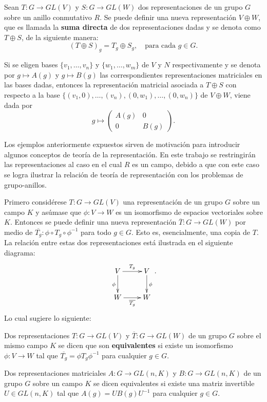 \begin{ejemplo}
Sean $T \colon G \to GL(V)$ y $S \colon G \to GL(W)$ dos representaciones de un grupo $G$ sobre un anillo conmutativo $R$. Se puede definir una nueva representación $V \oplus W$, que es llamada la \textbf{suma directa} de dos representaciones dadas y se denota como $T \oplus S$, de la siguiente manera: \begin{equation*} (T \oplus S)_g = T_g \oplus S_g, \quad \mbox{para cada } g \in G. \end{equation*}

Si se eligen bases $\{v_1, \dots, v_n\}$ y $\{ w_1, \dots, w_m \}$ de $V$ y $N$ respectivamente y se denota por $g \mapsto A(g)$ y $g \mapsto B(g)$ las correspondientes representaciones matriciales en las bases dadas, entonces la representación matricial asociada a $T \oplus S$ con respecto a la base $\{ (v_1,0), \dots , (v_n), (0,w_1), \dots, (0,w_n)  \}$ de $V \oplus W$, viene dada por
\begin{equation*} g \mapsto \begin{pmatrix}
A(g) & 0 \\
0 & B(g)
\end{pmatrix}. \end{equation*}
\end{ejemplo}
Los ejemplos anteriormente expuestos sirven de motivación para introducir algunos conceptos de teoría de la representación. En este trabajo se restringirán las representaciones al caso en el cual $R$ es un campo, debido a que con este caso se logra ilustrar la relación de teoría de representación con los problemas de grupo-anillos.

Primero considérese $T \colon G \to GL(V)$ una representación de un grupo $G$ sobre un campo $K$ y asúmase que $\phi \colon V \to W$ es un isomorfismo de espacios vectoriales sobre $K$. Entonces se puede definir una nueva representación $\overline{T} \colon G \to GL(W)$ por medio de $\overline{T_g} \colon \phi \circ T_g \circ \phi^{-1}$ para todo $g \in G$. Esto es, esencialmente, una copia de $T$. La relación entre estas dos representaciones está ilustrada en el siguiente diagrama:
\begin{equation*}\xymatrix { V \ar[r]^{T_g} 
\ar[d]_{\phi}
 & V \ar[d]^{\phi} \\
W \ar[r]_{\overline{T_g}} & W}.\end{equation*}
Lo cual sugiere lo siguiente:
\begin{definicion}
Dos representaciones $T \colon G \to GL(V)$ y $\overline{T} \colon G \to GL(W)$ de un grupo $G$ sobre el mismo campo $K$ se dicen que son \textbf{equivalentes} si existe un isomorfismo $\phi \colon V \to W$ tal que $\overline{T_g} = \phi T_g \phi^{-1} $ para cualquier $g \in G$.
\end{definicion}
\begin{definicion}
Dos representaciones matriciales $A \colon G \to GL(n,K)$ y $B \colon G \to GL(n,K)$ de un grupo $G$ sobre un campo $K$ se dicen equivalentes si existe una matriz invertible $U \in GL(n,K)$ tal que $A(g) = UB(g)U^{-1}$ para cualquier $g \in G$.
\end{definicion}

